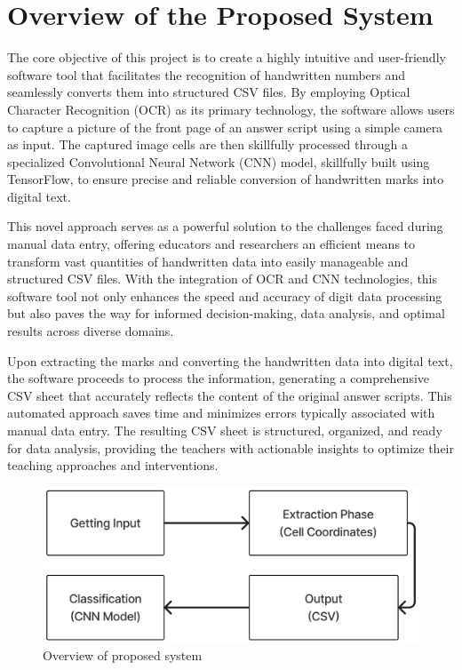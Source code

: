 \section{Overview of the Proposed System}

\noindent The core objective of this project is to create a highly intuitive and user-friendly software tool that facilitates the recognition of handwritten numbers and seamlessly converts them into structured CSV files. By employing Optical Character Recognition (OCR) as its primary technology, the software allows users to capture a picture of the front page of an answer script using a simple camera as input. The captured image cells are then skillfully processed through a specialized Convolutional Neural Network (CNN) model, skillfully built using TensorFlow, to ensure precise and reliable conversion of handwritten marks into digital text.

\noindent This novel approach serves as a powerful solution to the challenges faced during manual data entry, offering educators and researchers an efficient means to transform vast quantities of handwritten data into easily manageable and structured CSV files. With the integration of OCR and CNN technologies, this software tool not only enhances the speed and accuracy of digit data processing but also paves the way for informed decision-making, data analysis, and optimal results across diverse domains.

\noindent Upon extracting the marks and converting the handwritten data into digital text, the software proceeds to process the information, generating a comprehensive CSV sheet that accurately reflects the content of the original answer scripts. This automated approach saves time and minimizes errors typically associated with manual data entry. The resulting CSV sheet is structured, organized, and ready for data analysis, providing the teachers with actionable insights to optimize their teaching approaches and interventions.

\clearpage

\begin{figure}[htbp]
  \centering
  \includegraphics[width=\textwidth]{Images/prop_sys/overview_prop_sys.jpg}
  \caption{Overview of proposed system}
\end{figure}

